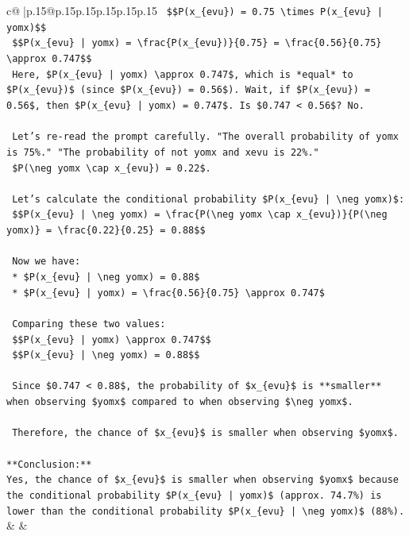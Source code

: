\documentclass{article}
\begin{document}
{\begin{supertabular}{c@{$\;$}|p{.15\linewidth}@{}p{.15\linewidth}p{.15\linewidth}p{.15\linewidth}p{.15\linewidth}p{.15\linewidth}}
{{{\texttt{    \$\$P(x\_\{evu\}) = 0.75 \textbackslash{}times P(x\_\{evu\} | yomx)\$\$} \\
\texttt{    \$\$P(x\_\{evu\} | yomx) = \textbackslash{}frac\{P(x\_\{evu\})\}\{0.75\} = \textbackslash{}frac\{0.56\}\{0.75\} \textbackslash{}approx 0.747\$\$} \\
\texttt{    Here, \$P(x\_\{evu\} | yomx) \textbackslash{}approx 0.747\$, which is *equal* to \$P(x\_\{evu\})\$ (since \$P(x\_\{evu\}) = 0.56\$). Wait, if \$P(x\_\{evu\}) = 0.56\$, then \$P(x\_\{evu\} | yomx) = 0.747\$. Is \$0.747 < 0.56\$? No.} \\
\\ 
\texttt{    Let's re{-}read the prompt carefully. "The overall probability of yomx is 75\%." "The probability of not yomx and xevu is 22\%."} \\
\texttt{    \$P(\textbackslash{}neg yomx \textbackslash{}cap x\_\{evu\}) = 0.22\$.} \\
\\ 
\texttt{    Let's calculate the conditional probability \$P(x\_\{evu\} | \textbackslash{}neg yomx)\$:} \\
\texttt{    \$\$P(x\_\{evu\} | \textbackslash{}neg yomx) = \textbackslash{}frac\{P(\textbackslash{}neg yomx \textbackslash{}cap x\_\{evu\})\}\{P(\textbackslash{}neg yomx)\} = \textbackslash{}frac\{0.22\}\{0.25\} = 0.88\$\$} \\
\\ 
\texttt{    Now we have:} \\
\texttt{    *   \$P(x\_\{evu\} | \textbackslash{}neg yomx) = 0.88\$} \\
\texttt{    *   \$P(x\_\{evu\} | yomx) = \textbackslash{}frac\{0.56\}\{0.75\} \textbackslash{}approx 0.747\$} \\
\\ 
\texttt{    Comparing these two values:} \\
\texttt{    \$\$P(x\_\{evu\} | yomx) \textbackslash{}approx 0.747\$\$} \\
\texttt{    \$\$P(x\_\{evu\} | \textbackslash{}neg yomx) = 0.88\$\$} \\
\\ 
\texttt{    Since \$0.747 < 0.88\$, the probability of \$x\_\{evu\}\$ is **smaller** when observing \$yomx\$ compared to when observing \$\textbackslash{}neg yomx\$.} \\
\\ 
\texttt{    Therefore, the chance of \$x\_\{evu\}\$ is smaller when observing \$yomx\$.} \\
\\ 
\texttt{**Conclusion:**} \\
\texttt{Yes, the chance of \$x\_\{evu\}\$ is smaller when observing \$yomx\$ because the conditional probability \$P(x\_\{evu\} | yomx)\$ (approx. 74.7\%) is lower than the conditional probability \$P(x\_\{evu\} | \textbackslash{}neg yomx)\$ (88\%).} \\
            }
        }
    }
    & & \\ \\


\end{supertabular}}
\end{document}
